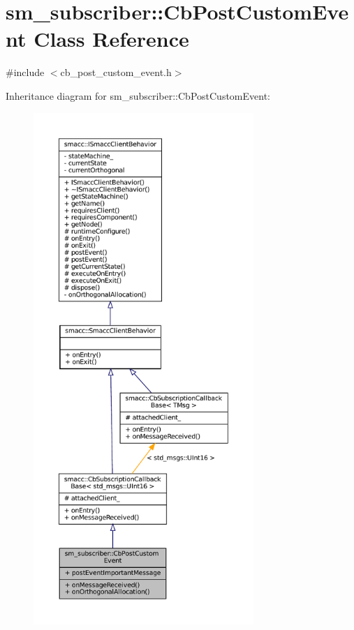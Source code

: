\hypertarget{classsm__subscriber_1_1CbPostCustomEvent}{}\section{sm\+\_\+subscriber\+:\+:Cb\+Post\+Custom\+Event Class Reference}
\label{classsm__subscriber_1_1CbPostCustomEvent}


{\ttfamily \#include $<$cb\+\_\+post\+\_\+custom\+\_\+event.\+h$>$}



Inheritance diagram for sm\+\_\+subscriber\+:\+:Cb\+Post\+Custom\+Event\+:
\nopagebreak
\begin{figure}[H]
\begin{center}
\leavevmode
\includegraphics[height=550pt]{classsm__subscriber_1_1CbPostCustomEvent__inherit__graph}
\end{center}
\end{figure}


